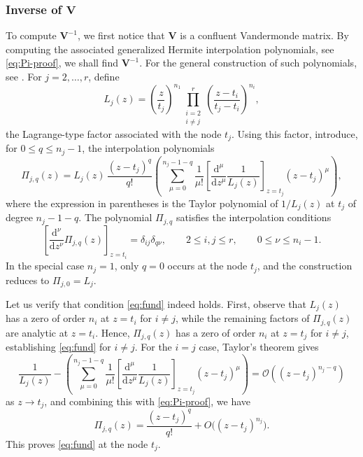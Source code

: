 \documentclass[a4paper,10pt,leqno]{amsart}
\numberwithin{equation}{section}
\theoremstyle{remark}
\newcommand{\dd}{\mathrm{d}}
\begin{document}
\subsubsection{Inverse of $\boldsymbol{V}$}

To compute $\bm V^{-1}$, we first notice that $\bm V$ is a confluent Vandermonde matrix. By computing the associated generalized Hermite interpolation polynomials, see \eqref{eq:Pi-proof}, we shall find $\bm V^{-1}$. For the general construction of such polynomials, see \cite{Spitzbart1960}.
For $j=2,\ldots,r$, define
\begin{equation}
    L_j(z)=\left(\frac{z}{t_j}\right)^{n_1}\prod_{\substack{i=2\\ i\neq j}}^r\left(\frac{z-t_i}{t_j-t_i}\right)^{n_i},
\end{equation}
the Lagrange-type factor associated with the node $t_j$. Using this factor, introduce, for $0\leq q\leq n_j-1$, the interpolation polynomials
\begin{equation}\label{eq:Pi-proof}
    \Pi_{j,q}(z) = L_j(z) \, \frac{(z-t_j)^q}{q!} \left( \sum_{\mu=0}^{n_j-1-q}\frac{1}{\mu!}\left[\frac{\dd^\mu}{\dd z^\mu}\frac{1}{L_j(z)}\right]_{z=t_j}(z-t_j)^\mu \right),
\end{equation}
where the expression in parentheses is the Taylor polynomial of $1/L_j(z)$ at $t_j$ of degree $n_j-1-q$. The polynomial $\Pi_{j,q}$ satisfies the interpolation conditions
\begin{equation}\label{eq:fund}
    \left[\frac{\dd^\nu}{\dd z^\nu}\Pi_{j,q}(z)\right]_{z=t_i} =\delta_{ij}\delta_{q\nu},\qquad 2\leq i,j\leq r,\qquad 0\leq \nu\leq n_i-1.
\end{equation}
In the special case $n_j=1$, only $q=0$ occurs at the node $t_j$, and the construction reduces to $\Pi_{j,0}=L_j$.

 

Let us verify that condition \eqref{eq:fund} indeed holds. First, observe that $L_j(z)$ has a zero of order $n_i$ at $z=t_i$ for $i \neq j$, while the remaining factors of $\Pi_{j,q}(z)$ are analytic at $z=t_i$. Hence, $\Pi_{j,q}(z)$ has a zero of order $n_i$ at $z = t_j$ for $i \neq j$, establishing \eqref{eq:fund} for $i \neq j$. For the $i=j$ case, Taylor's theorem gives 
\begin{equation}
    \frac{1}{L_j(z)} - \left(\sum_{\mu=0}^{n_j-1-q}\frac{1}{\mu!}\left[\frac{\dd^\mu}{\dd z^\mu}\frac{1}{L_j(z)}\right]_{z=t_j}(z-t_j)^\mu \right) = \mathcal O \left((z-t_j)^{n_j-q}\right)
\end{equation}
as $z \to t_j$, and combining this with \eqref{eq:Pi-proof}, we have
\begin{equation}
    \Pi_{j,q}(z)=\frac{(z-t_j)^q}{q!}+O\bigl((z-t_j)^{n_j}\bigr).
\end{equation}
This proves \eqref{eq:fund} at the node $t_j$.
\end{document}
